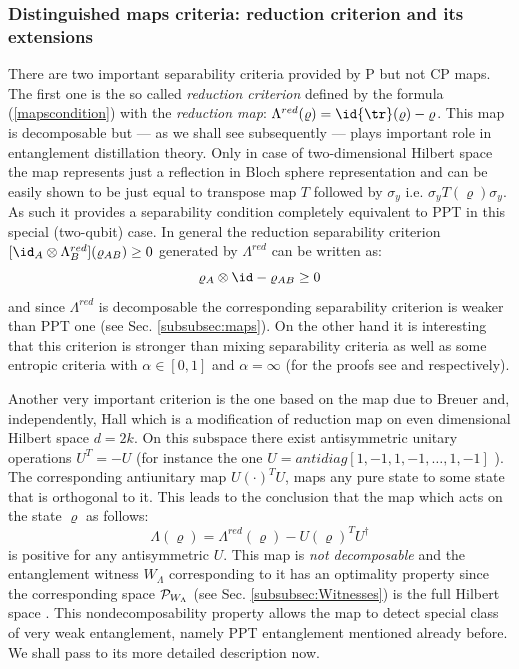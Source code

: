 \documentclass[rmp,12pt,preprint]{revtex4-2}
\begin{document}
\subsubsection{Distinguished maps criteria: reduction criterion and its extensions
\label{subsubsec:Reduction}}

There are two important separability criteria provided by P but not CP maps.
The first one is the so called {\it reduction criterion}
\cite{reduction,CerfAG} defined by the formula (\ref{mapscondition})
with the {\it reduction map}: $\Lambda^{red}(\varrho)= \id
{\tr}(\varrho)-\varrho$. This map is decomposable but --- as we shall
see subsequently --- plays important role in entanglement distillation
theory\cite{reduction}.  Only in case of two-dimensional Hilbert space
the map represents just a reflection in Bloch sphere representation
\cite{BengtssonZyczkowski-book} and can be easily shown to be just
equal to transpose map $T$ followed by $\sigma_y$
i.e. $\sigma_yT(\varrho)\sigma_y$. As such it provides a separability
condition completely equivalent to PPT in this special (two-qubit)
case. In general the reduction separability criterion $[\id_{A}
\otimes \Lambda^{red}_{B}](\varrho_{AB})\geq 0$ generated by
$\Lambda^{red}$ can be written as:
\begin{equation} \varrho_{A} \otimes \id
-\varrho_{AB}\geq 0
\end{equation}
and since $\Lambda^{red}$ is decomposable \cite{reduction} the
corresponding separability criterion is weaker than PPT one (see
Sec. \ref{subsubsec:maps}). On the other hand it is interesting that
this criterion is stronger \cite{Hiroshima} than mixing separability
criteria \cite{NielsenKempe} as well as some entropic criteria with
$\alpha \in [0,1]$ and $\alpha=\infty$ (for the proofs see
\cite{VollbrechtW} and \cite{reduction} respectively).

Another very important criterion is the one based on the map due to
Breuer and, independently, Hall \cite{Breuer2006-prl,Hall2006} which
is a modification of reduction map on even dimensional Hilbert space
$d=2k$. On this subspace there exist antisymmetric unitary operations
$U^{T}=-U$ (for instance the one $U=antidiag[1,-1,1,-1,\ldots,1,-1]$
\cite{Breuer2006-prl}). The corresponding antiunitary map
$U(\cdot)^{T}U$, maps any pure state to some state that is orthogonal
to it. This leads to the conclusion that the map which acts on the
state $\varrho$ as follows:
\begin{equation}
\Lambda(\varrho)=\Lambda^{red}(\varrho)-U(\varrho)^{T}U^{\dagger}
\end{equation}
is positive for any antisymmetric $U$. This map is {\it not
  decomposable} and the entanglement witness $W_{\Lambda}$ corresponding to it has an optimality property since the corresponding space ${\cal P}_{W_{\Lambda}}$
(see Sec. \ref{subsubsec:Witnesses}) is the full Hilbert space
\cite{Breuer2006-jpamg}. This nondecomposability property allows the
map to detect special class of very weak entanglement, namely PPT
entanglement mentioned already before. We shall pass to its more
detailed description now.
\end{document}
